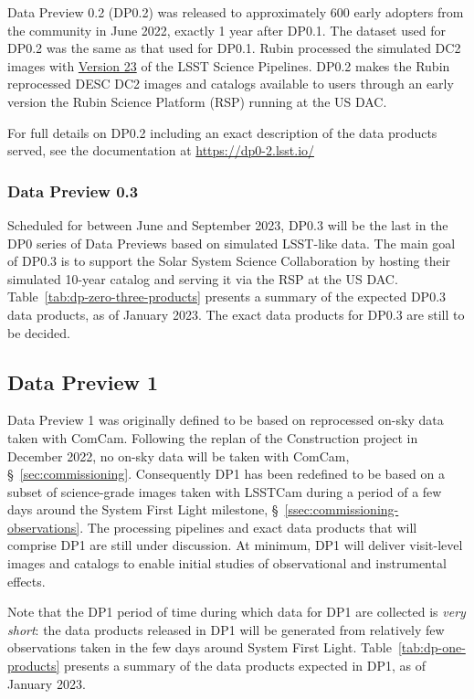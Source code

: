 Data Preview 0.2 (DP0.2) was released to approximately 600 early adopters from the community in June 2022, exactly 1 year after DP0.1. 
The dataset used for DP0.2 was the same as that used for DP0.1.
Rubin processed the simulated DC2 images with \href{https://pipelines.lsst.io/v/v23_0_0/index.html}{Version 23} of the LSST Science Pipelines. 
DP0.2 makes the Rubin reprocessed DESC DC2 images and catalogs available to users through an early version the Rubin Science Platform (RSP) running at the US DAC. 

For full details on DP0.2 including an exact description of the data products served, see the documentation at \url{https://dp0-2.lsst.io/}

\subsubsection{Data Preview 0.3}

Scheduled for between June and September 2023, DP0.3 will be the last in the DP0 series of Data Previews based on simulated LSST-like data. 
The main goal of DP0.3 is to support the Solar System Science Collaboration by hosting their simulated 10-year catalog and serving it via the RSP at the US DAC. 
Table~\ref{tab:dp-zero-three-products} presents a summary of the expected DP0.3 data products, as of January 2023.
The exact data products for DP0.3 are still to be decided. 

\subsection{Data Preview 1}

Data Preview 1 was originally defined to be based on reprocessed on-sky data taken with ComCam.
Following the replan of the Construction project in December 2022, no on-sky data will be taken with ComCam, \S~\ref{sec:commissioning}.
Consequently DP1 has been redefined to be based on a subset of science-grade images taken with LSSTCam during a period of a few days around the System First Light milestone, \S~\ref{ssec:commissioning-observations}.
The processing pipelines and exact data products that will comprise DP1 are still under discussion. 
At minimum, DP1 will deliver visit-level images and catalogs to enable initial studies of observational and instrumental effects. 

Note that the DP1 period of time during which data for DP1 are collected is \textit{very short}: the data products released in DP1 will be generated from relatively few observations taken in the few days around System First Light.
Table~\ref{tab:dp-one-products} presents a summary of the data products expected in DP1, as of January 2023.

